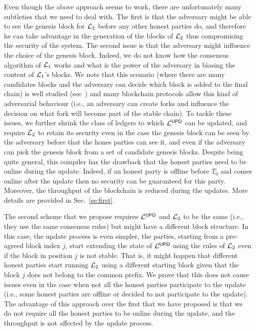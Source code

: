 Even though the above approach seems to work, there are unfortunately many subtleties that we need to deal with.
The first is that the adversary might be able to see the genesis block for $\mathcal{L}_2$ before any other honest parties do, and therefore he can take advantage in the generation of the blocks of $\mathcal{L}_2$ thus compromising the security of the system. 
The second issue is that the adversary might influence the choice of the genesis block. Indeed, we do not know how the consensus algorithm of $\mathcal{L}_1$ works and what is the power of the adversary in biasing the content of $\mathcal{L}_1$'s blocks. We note that this scenario (where there are many candidates blocks and the adversary can decide which block is added to the final chain) is well studied (see~\cite{EC:GarKiaLeo15}) and many blockchain protocols allow this kind of adversarial behaviour (i.e., an adversary can create forks and influence the decision on what fork will become part of the stable chain). 
To tackle these issues, we further shrink the class of ledgers to which $\mathcal{L}^\mathsf{UPD}$ can be updated, and require
$\mathcal{L}_2$ to retain its security even in the case the genesis block can be seen by the adversary before that the hones parties can see it, and even if the adversary can pick the genesis block from a set of candidate genesis blocks.
Despite being quite general, this compiler has the drawback that the honest parties need to be online during the update. Indeed, if an honest party is offline before $T_0$ and comes online after the update then no security can be guaranteed for this party. Moreover, the throughput of the blockchain is reduced during the updates.  More details are provided in Sec.~\ref{se:first}.

The second scheme that we propose requires $\mathcal{L}^\mathsf{UPD}$ and $\mathcal{L}_2$ to be the same (i.e.,  they use the same consensus rules) but might have a different block structure. In this case, the update process is even simpler,
the parties, starting from a pre-agreed block index $j$, start extending the state of  $\mathcal{L}^\mathsf{UPD}$ using the rules of
$\mathcal{L}_2$ even if the block in position $j$ is not stable. That is, it might happen that different honest parties 
start running $\mathcal{L}_2$ using a different starting block given that the block $j$ does not belong to the common prefix. We prove that this does not cause issues even in the case when not all the honest parties participate 
to the update (i.e., some honest parties are offline or decided to not participate to the update). 
The advantage of this approach over the first that we have proposed is that we do not require all the honest parties to be online during the update, and the throughput is not affected by the update process. 


